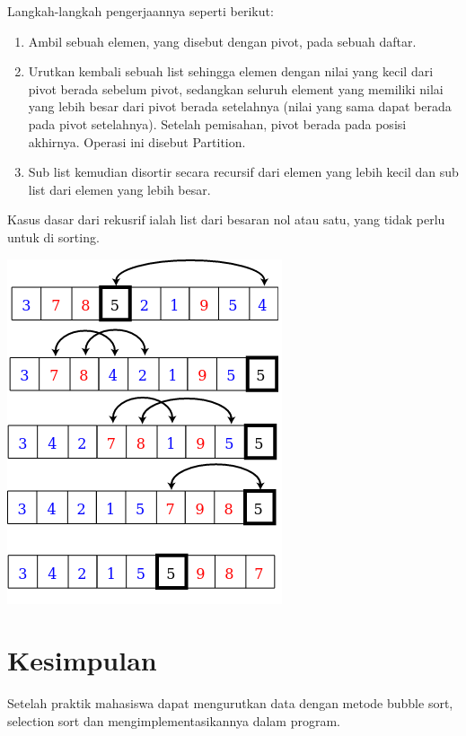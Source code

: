 \documentclass[a4paper,12pt]{article}
\begin{document}
Langkah-langkah pengerjaannya seperti berikut:
\begin{enumerate}
    \item Ambil sebuah elemen, yang disebut dengan pivot, pada sebuah daftar.
    \item Urutkan kembali sebuah list sehingga elemen dengan nilai yang kecil dari pivot berada sebelum pivot, sedangkan
        seluruh element yang memiliki nilai yang lebih besar dari pivot berada setelahnya (nilai yang sama dapat berada
        pada pivot setelahnya). Setelah pemisahan, pivot berada pada posisi akhirnya. Operasi ini disebut Partition.
    \item Sub list kemudian disortir secara recursif dari elemen yang lebih kecil dan sub list dari elemen yang lebih
        besar.
\end{enumerate}
Kasus dasar dari rekusrif ialah list dari besaran nol atau satu, yang tidak perlu untuk di sorting.
\begin{center}
    \includegraphics[scale=0.8]{quicksort.png} 
\end{center}

\newpage

\section{Kesimpulan}
Setelah praktik mahasiswa dapat mengurutkan data dengan metode bubble sort, selection sort
dan mengimplementasikannya dalam program.
\end{document}
